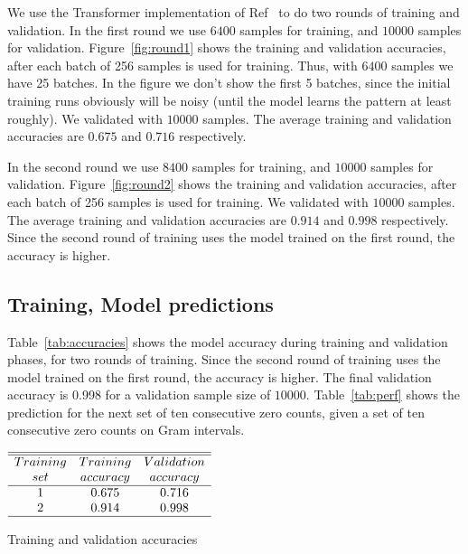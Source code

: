 \documentclass[twoside]{article}
\begin{document}
We use the Transformer implementation of Ref~\cite{shankergit} to do two rounds of training and validation. In the first round we use $6400$ samples for training, and $10000$ samples for validation. Figure~\ref{fig:round1} shows the training and validation accuracies, after each batch of 256 samples is used for training. Thus, with $6400$ samples we have 25 batches. In the figure we don't show the first 5 batches, since the initial training runs obviously will be noisy (until the model learns the pattern at least roughly). We validated with $10000$ samples. The average training and validation accuracies are $0.675$ and $0.716$ respectively.

In the second round we use $8400$ samples for training, and $10000$ samples for validation. Figure~\ref{fig:round2} shows the training and validation accuracies, after each batch of 256 samples is used for training.  We validated with $10000$ samples. The average training and validation accuracies are $0.914$ and $0.998$ respectively. Since the second round of training uses the model trained on the first round, the accuracy is higher.

\subsection{\label{relation}Training,  Model predictions}

Table~\ref{tab:accuracies} shows the model accuracy during training and validation phases, for two rounds of training. Since the second round of training uses the model trained on the first round, the accuracy is higher. The final validation accuracy is 0.998 for a validation sample size of $10000$.
Table~\ref{tab:perf} shows the prediction for the next set of ten consecutive zero counts, given a set of ten consecutive zero counts on Gram intervals.  

\begin{table}
\centering \(\begin{array}{ccc}
\hline
\hline
Training  & Training &Validation  \\
set     &accuracy&accuracy\\
\hline
1  & 0.675 & 0.716 \\

2  & 0.914 & 0.998 \\
\hline
\end{array}\)
\caption{Training and validation accuracies}
\label{tab:accuracies}
\end{table}
\end{document}
